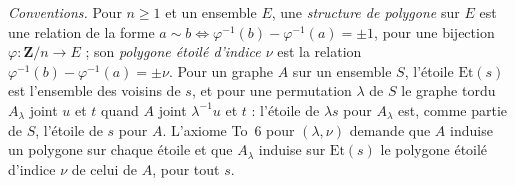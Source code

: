 \noindent\emph{Conventions.} Pour $n \geq 1$ et un ensemble $E$, une \emph{structure de polygone} sur $E$ est une relation de la forme $a \sim b \iff \varphi^{-1}(b) - \varphi^{-1}(a) = \pm 1$, pour une bijection $\varphi : \mathbf Z/n \to E$ ; son \emph{polygone étoilé d'indice $\nu$} est la relation $\varphi^{-1}(b) - \varphi^{-1}(a) = \pm \nu$. Pour un graphe $A$ sur un ensemble $S$, l'étoile $\mathrm{Et}(s)$ est l'ensemble des voisins de $s$, et pour une permutation $\lambda$ de $S$ le graphe tordu $A_\lambda$ joint $u$ et $t$ quand $A$ joint $\lambda^{-1}u$ et $t$ : l'étoile de $\lambda s$ pour $A_\lambda$ est, comme partie de $S$, l'étoile de $s$ pour $A$. L'axiome To~6 pour $(\lambda, \nu)$ demande que $A$ induise un polygone sur chaque étoile et que $A_\lambda$ induise sur $\mathrm{Et}(s)$ le polygone étoilé d'indice $\nu$ de celui de $A$, pour tout $s$.

